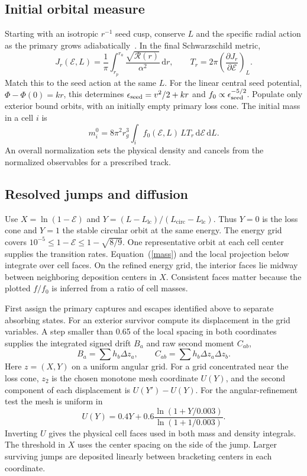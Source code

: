 \documentclass[aps,prd,reprint,amsmath,amssymb,nofootinbib]{revtex4-2}
\newcommand{\E}{\mathcal E}
\newcommand{\dd}{\mathrm{d}}
\newcommand{\lc}{\mathrm{lc}}
\newcommand{\circsub}{\mathrm{circ}}
\begin{document}
\subsection{Initial orbital measure}
Starting with an isotropic $r^{-1}$ seed cusp, conserve $L$ and the specific radial action as the primary grows adiabatically~\cite{SFW}. In the final Schwarzschild metric,
\begin{equation}
 J_r(\E,L)=\frac1\pi\int_{r_p}^{r_a}
         \frac{\sqrt{\mathcal R(r)}}{\alpha^2}\,\dd r,\qquad
 T_r=2\pi\left(\frac{\partial J_r}{\partial\E}\right)_L .
\end{equation}
Match this to the seed action at the same $L$. For the linear central seed potential, $\Phi-\Phi(0)=kr$, this determines $\epsilon_{\rm seed}=v^2/2+kr$ and $f_0\propto\epsilon_{\rm seed}^{-5/2}$. Populate only exterior bound orbits, with an initially empty primary loss cone. The initial mass in a cell $i$ is
\begin{equation}
 m_i^0=8\pi^2 r_g^3\int_i f_0(\E,L)\,L T_r\,\dd\E\,\dd L .
 \label{mass}
\end{equation}
An overall normalization sets the physical density and cancels from the normalized observables for a prescribed track.

\subsection{Resolved jumps and diffusion}
Use $X=\ln(1-\E)$ and $Y=(L-L_{\lc})/(L_{\circsub}-L_{\lc})$. Thus $Y=0$ is the loss cone and $Y=1$ the stable circular orbit at the same energy. The energy grid covers $10^{-5}\le 1-\E\le1-\sqrt{8/9}$. One representative orbit at each cell center supplies the transition rates. Equation~(\ref{mass}) and the local projection below integrate over cell faces. On the refined energy grid, the interior faces lie midway between neighboring deposition centers in $X$. Consistent faces matter because the plotted $f/f_0$ is inferred from a ratio of cell masses.

First assign the primary captures and escapes identified above to separate absorbing states. For an exterior survivor compute its displacement in the grid variables. A step smaller than 0.65 of the local spacing in both coordinates supplies the integrated signed drift $B_a$ and raw second moment $C_{ab}$,
\begin{equation}
 B_a=\sum h_b\Delta z_a,\qquad
 C_{ab}=\sum h_b\Delta z_a\Delta z_b .
 \label{mom}
\end{equation}
Here $z=(X,Y)$ on a uniform angular grid. For a grid concentrated near the loss cone, $z_2$ is the chosen monotone mesh coordinate $U(Y)$, and the second component of each displacement is $U(Y')-U(Y)$. For the angular-refinement test the mesh is uniform in
\begin{equation}
 U(Y)=0.4Y+0.6\frac{\ln(1+Y/0.003)}{\ln(1+1/0.003)} .
\end{equation}
Inverting $U$ gives the physical cell faces used in both mass and density integrals. The threshold in $X$ uses the center spacing on the side of the jump. Larger surviving jumps are deposited linearly between bracketing centers in each coordinate.
\end{document}
